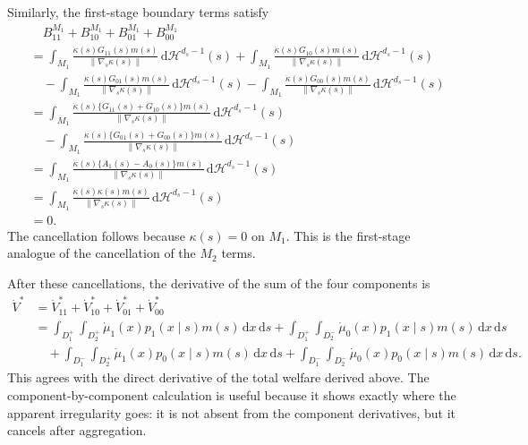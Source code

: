 \documentclass[12pt]{article}
\newcommand{\1}{\mathbf{1}}
\begin{document}
Similarly, the first-stage boundary terms satisfy
\begin{align*}
&\quad
B_{11}^{M_1}+B_{10}^{M_1}+B_{01}^{M_1}+B_{00}^{M_1} \\
&=
\int_{M_1}
\frac{\dot\kappa(s)G_{11}(s)m(s)}
{\lVert\nabla_s\kappa(s)\rVert}
\,\mathrm d\mathcal H^{d_s-1}(s)
+
\int_{M_1}
\frac{\dot\kappa(s)G_{10}(s)m(s)}
{\lVert\nabla_s\kappa(s)\rVert}
\,\mathrm d\mathcal H^{d_s-1}(s) \\
&\quad-
\int_{M_1}
\frac{\dot\kappa(s)G_{01}(s)m(s)}
{\lVert\nabla_s\kappa(s)\rVert}
\,\mathrm d\mathcal H^{d_s-1}(s)
-
\int_{M_1}
\frac{\dot\kappa(s)G_{00}(s)m(s)}
{\lVert\nabla_s\kappa(s)\rVert}
\,\mathrm d\mathcal H^{d_s-1}(s) \\
&=
\int_{M_1}
\frac{\dot\kappa(s)\{G_{11}(s)+G_{10}(s)\}m(s)}
{\lVert\nabla_s\kappa(s)\rVert}
\,\mathrm d\mathcal H^{d_s-1}(s) \\
&\quad-
\int_{M_1}
\frac{\dot\kappa(s)\{G_{01}(s)+G_{00}(s)\}m(s)}
{\lVert\nabla_s\kappa(s)\rVert}
\,\mathrm d\mathcal H^{d_s-1}(s) \\
&=
\int_{M_1}
\frac{\dot\kappa(s)\{A_1(s)-A_0(s)\}m(s)}
{\lVert\nabla_s\kappa(s)\rVert}
\,\mathrm d\mathcal H^{d_s-1}(s) \\
&=
\int_{M_1}
\frac{\dot\kappa(s)\kappa(s)m(s)}
{\lVert\nabla_s\kappa(s)\rVert}
\,\mathrm d\mathcal H^{d_s-1}(s) \\
&=0.
\end{align*}
The cancellation follows because $\kappa(s)=0$ on $M_1$. This is the
first-stage analogue of the cancellation of the $M_2$ terms.

After these cancellations, the derivative of the sum of the four components is
\begin{align*}
\dot V^*
&=
\dot V_{11}^*+\dot V_{10}^*+\dot V_{01}^*+\dot V_{00}^* \\
&=
\int_{D_1^+}\int_{D_2^+}
\dot\mu_1(x)p_1(x\mid s)m(s)\,\mathrm dx\,\mathrm ds
+
\int_{D_1^+}\int_{D_2^-}
\dot\mu_0(x)p_1(x\mid s)m(s)\,\mathrm dx\,\mathrm ds \\
&\quad+
\int_{D_1^-}\int_{D_2^+}
\dot\mu_1(x)p_0(x\mid s)m(s)\,\mathrm dx\,\mathrm ds
+
\int_{D_1^-}\int_{D_2^-}
\dot\mu_0(x)p_0(x\mid s)m(s)\,\mathrm dx\,\mathrm ds.
\end{align*}
This agrees with the direct derivative of the total welfare derived above. The
component-by-component calculation is useful because it shows exactly where
the apparent irregularity goes: it is not absent from the component
derivatives, but it cancels after aggregation.
\end{document}
